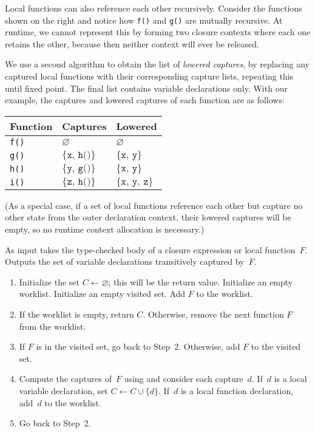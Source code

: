 \documentclass[../generics]{subfiles}
\begin{document}
Local functions can also reference each other recursively. Consider the functions shown on the right and notice how \texttt{f()} and \texttt{g()} are mutually recursive. At runtime, we cannot represent this by forming two closure contexts where each one retains the other, because then neither context will ever be released.

We use a second algorithm to obtain the list of \emph{lowered captures}, by replacing any captured local functions with their corresponding capture lists, repeating this until fixed point. The final list contains variable declarations only. With our example, the captures and lowered captures of each function are as follows:

\begin{center}
\begin{tabular}{lll}
\toprule
\textbf{Function}&\textbf{Captures}&\textbf{Lowered}\\
\midrule
\texttt{f()}&$\varnothing$&$\varnothing$\\
\texttt{g()}&$\{\texttt{x},\,\texttt{h()}\}$&$\{\texttt{x},\,\texttt{y}\}$\\
\texttt{h()}&$\{\texttt{y},\,\texttt{g()}\}$&$\{\texttt{x},\,\texttt{y}\}$\\
\texttt{i()}&$\{\texttt{z},\,\texttt{h()}\}$&$\{\texttt{x},\,\texttt{y},\,\texttt{z}\}$\\
\bottomrule
\end{tabular}
\end{center}

(As a special case, if a set of local functions reference each other but capture no other state from the outer declaration context, their lowered captures will be empty, so no runtime context allocation is necessary.)

\begin{algorithm}\label{lowered closure captures algorithm}
As input takes the type-checked body of a closure expression or local function~$F$. Outputs the set of variable declarations transitively captured by~$F$.
\begin{enumerate}
\item Initialize the set $C\leftarrow\varnothing$; this will be the return value. Initialize an empty worklist. Initialize an empty visited set. Add $F$ to the worklist.
\item If the worklist is empty, return $C$. Otherwise, remove the next function $F$ from the worklist.
\item If $F$ is in the visited set, go back to Step~2. Otherwise, add $F$ to the visited set.
\item Compute the captures of~$F$ using  and consider each capture~$d$. If~$d$ is a local variable declaration, set $C\leftarrow C\cup\{d\}$. If~$d$ is a local function declaration, add~$d$ to the worklist.
\item Go back to Step~2.
\end{enumerate}
\end{algorithm}
\end{document}

